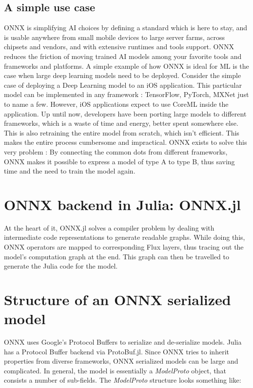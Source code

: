 \documentclass{juliacon}
\begin{document}
\subsection{A simple use case}
ONNX is simplifying AI choices by defining a standard which is here to stay, and is usable anywhere from small mobile devices to large server farms, across chipsets and vendors, and with extensive runtimes and tools support. ONNX reduces the friction of moving trained AI
models among your favorite tools and frameworks and platforms. A simple example of how ONNX is ideal for ML is the case when large deep learning models need to be deployed. \newline \newline \newline Consider the simple case of deploying a Deep Learning model to an iOS
application. This particular model can be implemented in any framework : TensorFlow, PyTorch, MXNet just to name a few. However, iOS applications expect to use CoreML inside the application. Up until now, developers have been porting large models to different frameworks,
which is a waste of time and energy, better spent somewhere else. This is also retraining the entire model from scratch, which isn't efficient. This makes the entire process cumbersome and impractical. ONNX exists to solve this very problem : By connecting the common dots from
different frameworks, ONNX makes it possible to express a model of type A to type B, thus saving time and the need to train the model again.

\section{ONNX backend in Julia: ONNX.jl}

At the heart of it, ONNX.jl solves a compiler problem by dealing with intermediate code representations to generate readable graphs. While doing this, ONNX operators are mapped to corresponding Flux layers, thus tracing out the model's computation graph at the end. This graph can then be travelled to generate the Julia code for the model. 

\section{Structure of an ONNX serialized model}

ONNX uses Google's Protocol Buffers to serialize and de-serialize models. Julia has a Protocol Buffer backend via ProtoBuf.jl. \newline
Since ONNX tries to inherit properties from diverse frameworks, ONNX serialized models can be large and complicated. In general, the model is essentially a \textit{ModelProto} object, that consists a number of sub-fields. The \textit{ModelProto} structure looks something like:
\end{document}
